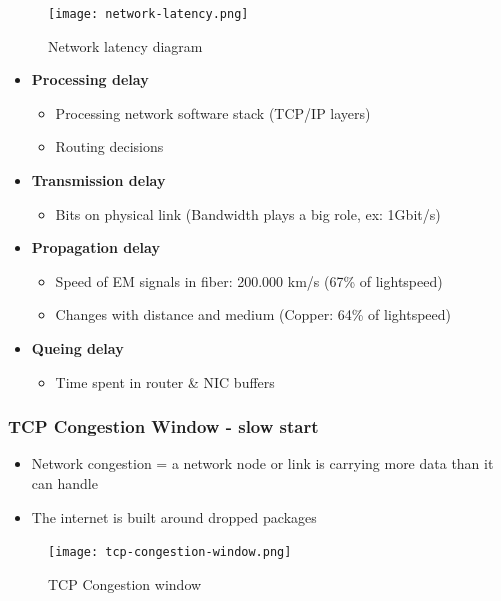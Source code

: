 \documentclass{article}
\begin{document}
\begin{figure}[H]
    \centering
    \texttt{[image: network-latency.png]}
    \caption{Network latency diagram}
\end{figure}

\begin{itemize}
    \item \textbf{Processing delay}
    \begin{itemize}
        \item Processing network software stack (TCP/IP layers)
        \item Routing decisions
    \end{itemize}
    \item \textbf{Transmission delay}
    \begin{itemize}
        \item Bits on physical link (Bandwidth plays a big role, ex: 1Gbit/s)
    \end{itemize}
    \item \textbf{Propagation delay}
    \begin{itemize}
        \item Speed of EM signals in fiber: 200.000 km/s (67\% of lightspeed)
        \item Changes with distance and medium (Copper: 64\% of lightspeed)
    \end{itemize}
    \item \textbf{Queing delay}
    \begin{itemize}
        \item Time spent in router \& NIC buffers
    \end{itemize}
\end{itemize}

\subsubsection{TCP Congestion Window - slow start}

\begin{itemize}
    \item Network congestion = a network node or link is carrying more data than it can handle
    \item The internet is built around dropped packages
\end{itemize}

\begin{figure}[H]
    \centering
    \texttt{[image: tcp-congestion-window.png]}
    \caption{TCP Congestion window}
\end{figure}
\end{document}
